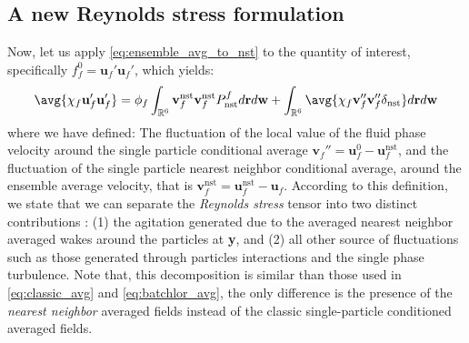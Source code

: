 \subsection{A new Reynolds stress formulation}

Now, let us apply \ref{eq:ensemble_avg_to_nst} to the quantity of interest, specifically $f_f^0 = \textbf{u}_f'\textbf{u}_f'$, which yields: 
\begin{equation}
    \avg{\chi_f \textbf{u}_f'\textbf{u}_f'}
    = 
    \phi_f
    \int_{\mathbb{R}^6}
    \textbf{v}_f^\text{nst}
    \textbf{v}_f^\text{nst}
    P_\text{nst}^f
    d\textbf{r}
    d\textbf{w}
    + 
    \int_{\mathbb{R}^6}
    \avg{
        \chi_f
        \textbf{v}_f''
        \textbf{v}_f''
        \delta_\text{nst}
    }
    d\textbf{r}
    d\textbf{w}
    \label{eq:relation_ensemble_nst}
\end{equation}
where we have defined: 
The fluctuation of the local value of the fluid phase velocity around the single particle conditional average $\textbf{v}_f'' = \textbf{u}_f^0 - \textbf{u}_f^\text{nst}$, and the fluctuation of the single particle nearest neighbor conditional average, around the ensemble average velocity, that is $\textbf{v}_f^\text{nst} = \textbf{u}_f^\text{nst} - \textbf{u}_f$. 
According to this definition, 
we state that we can separate the \textit{Reynolds stress} tensor into two distinct contributions :  (1) the agitation generated due to the averaged nearest neighbor averaged wakes around the particles at \textbf{y}, and (2) all other source of fluctuations such as those generated through particles interactions and the single phase turbulence. 
Note that, this decomposition is similar than those used in \ref{eq:classic_avg} and \ref{eq:batchlor_avg}, the only difference is the presence of the \textit{nearest neighbor} averaged fields instead of the classic single-particle conditioned averaged fields. 

